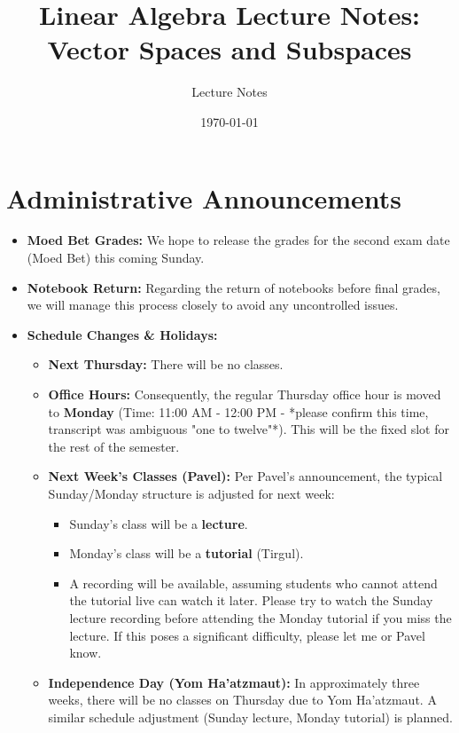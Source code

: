 \documentclass[11pt]{article}
\title{Linear Algebra Lecture Notes: \\ Vector Spaces and Subspaces}
\author{Lecture Notes} %
\date{\today} %
\theoremstyle{definition}
\theoremstyle{remark}
\begin{document}
\maketitle

\section*{Administrative Announcements}

\begin{itemize}
    \item \textbf{Moed Bet Grades:} We hope to release the grades for the second exam date (Moed Bet) this coming Sunday.
    \item \textbf{Notebook Return:} Regarding the return of notebooks before final grades, we will manage this process closely to avoid any uncontrolled issues.
    \item \textbf{Schedule Changes \& Holidays:}
        \begin{itemize}
            \item \textbf{Next Thursday:} There will be no classes.
            \item \textbf{Office Hours:} Consequently, the regular Thursday office hour is moved to \textbf{Monday} (Time: 11:00 AM - 12:00 PM - *please confirm this time, transcript was ambiguous "one to twelve"*). This will be the fixed slot for the rest of the semester.
            \item \textbf{Next Week's Classes (Pavel):} Per Pavel's announcement, the typical Sunday/Monday structure is adjusted for next week:
                \begin{itemize}
                    \item Sunday's class will be a \textbf{lecture}.
                    \item Monday's class will be a \textbf{tutorial} (Tirgul).
                    \item A recording will be available, assuming students who cannot attend the tutorial live can watch it later. Please try to watch the Sunday lecture recording before attending the Monday tutorial if you miss the lecture. If this poses a significant difficulty, please let me or Pavel know.
                \end{itemize}
            \item \textbf{Independence Day (Yom Ha'atzmaut):} In approximately three weeks, there will be no classes on Thursday due to Yom Ha'atzmaut. A similar schedule adjustment (Sunday lecture, Monday tutorial) is planned.

\end{itemize}
\end{itemize}
\end{document}
